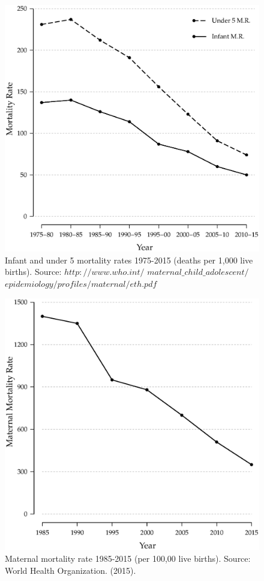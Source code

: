 \documentclass[a4paper, twocolumn]{article}
\begin{document}
\begin{figure}[!hbtp]
\includegraphics[width = \columnwidth]{../figures/fig2.eps}
\caption{Infant and under 5 mortality rates 1975-2015 (deaths per 1,000 live births). Source: $http://www.who.int/$ $maternal\_ child\_adolescent/$ $epidemiology/profiles/maternal/eth.pdf$}\label{Fig:2}
\end{figure}




\begin{figure}[!hbtp]
\includegraphics[width = \columnwidth]{../figures/fig3.eps}
\caption{Maternal mortality rate 1985-2015 (per 100,00 live births). Source: World Health Organization. (2015).} \label{Fig:3}
\end{figure}
\end{document}
